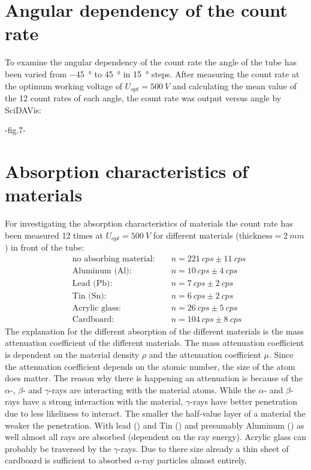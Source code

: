 \section{Angular dependency of the count rate}
To examine the angular dependency of the count rate the angle of the tube has been varied from \SI[]{-45}[]{\degree} to
\SI[]{+45}[]{\degree} in \SI[]{15}[]{\degree} steps. After measuring the count rate at the optimum working voltage of
\(U_{opt}=\SI{500}{V}\) and calculating the mean value of the 12 count rates of each angle, the count rate was output
versus angle by SciDAVis:\par
-fig.7-\par
%
\section{Absorption characteristics of materials}
%
For investigating the absorption characteristics of materials the count rate has been measured 12 times at
\(U_{opt}=\SI{500}{V}\) for different materials (\(\text{thickness}=\SI{2}{mm}\)) in front of the tube:
%
\begin{align}
    &\text{no absorbing material: }  &&n = \SI{221}{cps} \pm \SI{11}{cps}\\
    &\text{Aluminum (Al): }          &&n = \SI{10}{cps} \pm \SI{4}{cps}\\
    &\text{Lead (Pb): }              &&n = \SI{7}{cps} \pm \SI{2}{cps}\\
    &\text{Tin (Sn): }               &&n = \SI{6}{cps} \pm \SI{2}{cps}\\
    &\text{Acrylic glass: }          &&n = \SI{26}{cps} \pm \SI{5}{cps}\\
    &\text{Cardboard: }              &&n = \SI{104}{cps} \pm \SI{8}{cps}
\end{align}
%
The explanation for the different absorption of the different materials is the mass attenuation coefficient of the
different materials. The mass attenuation coefficient is dependent on the material density \(\rho\) and the attenuation
coefficient \( \mu \). Since the attenuation coefficient depends on the atomic number, the size of the atom does
matter. The reason why there is happening an attenuation is because of the \(\alpha\)-, \(\beta\)- and \(\gamma\)-rays are
interacting with the material atoms. While the \(\alpha\)- and \(\beta\)-rays have a strong interaction with the material,
\(\gamma\)-rays have better penetration due to less likeliness to interact. The smaller the half-value layer of a
material the weaker the penetration. With lead () and Tin () and presumably Aluminum
() as well almost all rays are absorbed (dependent on the ray energy). Acrylic glass can probably be
traversed by the \(\gamma\)-rays. Due to there size already a thin sheet of cardboard is sufficient to absorbed
\(\alpha\)-ray particles almost entirely.
%
